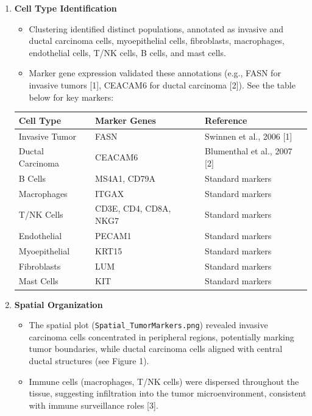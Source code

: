 \documentclass[
]{article}
\providecommand{\tightlist}{%
  \setlength{\itemsep}{0pt}\setlength{\parskip}{0pt}}
\begin{document}
\begin{enumerate}
\def\labelenumi{\arabic{enumi}.}
\tightlist
\item
  \textbf{Cell Type Identification}

  \begin{itemize}
  \tightlist
  \item
    Clustering identified distinct populations, annotated as invasive
    and ductal carcinoma cells, myoepithelial cells, fibroblasts,
    macrophages, endothelial cells, T/NK cells, B cells, and mast cells.
  \item
    Marker gene expression validated these annotations (e.g., FASN for
    invasive tumors {[}1{]}, CEACAM6 for ductal carcinoma {[}2{]}). See
    the table below for key markers:
  \end{itemize}

  \begin{longtable}[]{@{}lll@{}}
  \toprule\noalign{}
  Cell Type & Marker Genes & Reference \\
  \midrule\noalign{}
  \endhead
  \bottomrule\noalign{}
  \endlastfoot
  Invasive Tumor & FASN & Swinnen et al., 2006 {[}1{]} \\
  Ductal Carcinoma & CEACAM6 & Blumenthal et al., 2007 {[}2{]} \\
  B Cells & MS4A1, CD79A & Standard markers \\
  Macrophages & ITGAX & Standard markers \\
  T/NK Cells & CD3E, CD4, CD8A, NKG7 & Standard markers \\
  Endothelial & PECAM1 & Standard markers \\
  Myoepithelial & KRT15 & Standard markers \\
  Fibroblasts & LUM & Standard markers \\
  Mast Cells & KIT & Standard markers \\
  \end{longtable}
\item
  \textbf{Spatial Organization}

  \begin{itemize}
  \tightlist
  \item
    The spatial plot (\texttt{Spatial\_TumorMarkers.png}) revealed
    invasive carcinoma cells concentrated in peripheral regions,
    potentially marking tumor boundaries, while ductal carcinoma cells
    aligned with central ductal structures (see Figure 1).
  \item
    Immune cells (macrophages, T/NK cells) were dispersed throughout the
    tissue, suggesting infiltration into the tumor microenvironment,
    consistent with immune surveillance roles {[}3{]}.
  \end{itemize}


\end{enumerate}
\end{document}

